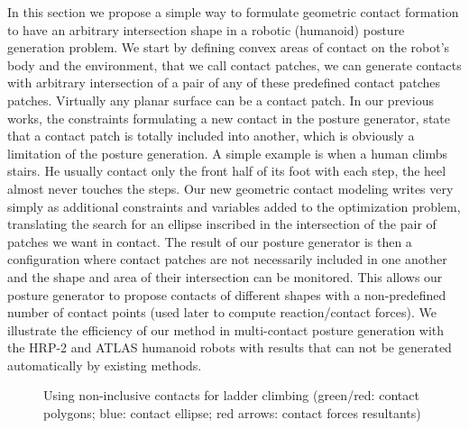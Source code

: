 In this section we propose a simple way to formulate geometric contact formation to have an arbitrary intersection shape in a robotic (humanoid) posture generation problem.
We start by defining convex areas of contact on the robot's body and the environment, that we call contact patches, we can generate contacts with arbitrary intersection of a pair of any of these predefined contact patches patches.
Virtually any planar surface can be a contact patch.
In our previous works, the constraints formulating a new contact in the posture generator, state that a contact patch is totally included into another, which is obviously a limitation of the posture generation.
A simple example is when a human climbs stairs. He usually contact only the front half of its foot with each step, the heel almost never touches the steps.
Our new geometric contact modeling writes very simply as additional constraints and variables added to the optimization problem, translating the search for an ellipse inscribed in the intersection of the pair of patches we want in contact.
The result of our posture generator is then a configuration where contact patches are not necessarily included in one another and the shape and area of their intersection can be monitored.
This allows our posture generator to propose contacts of different shapes with a non-predefined number of contact points (used later to compute reaction/contact forces).
We illustrate the efficiency of our method in multi-contact posture generation with the HRP-2 and ATLAS humanoid robots with results that can not be generated automatically by existing methods.

\begin{figure}
\centering
  \centering
  \setlength\fboxsep{0pt}
  \setlength\fboxrule{1pt}
\caption{Using non-inclusive contacts for ladder climbing (green/red: contact polygons; blue: contact ellipse; red arrows: contact forces resultants)}
\label{fig:hrp2_jrl_complete}
\end{figure}

